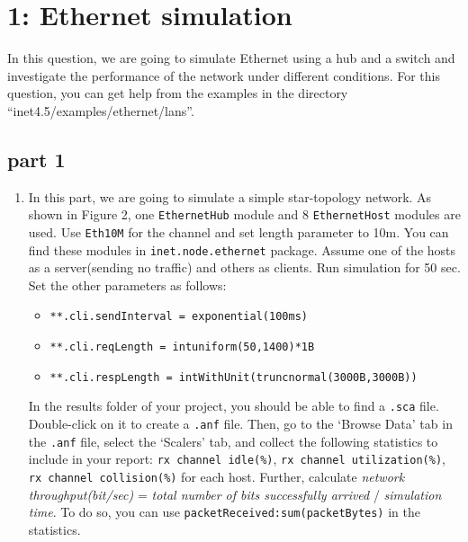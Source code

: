 \section{ 1: Ethernet simulation}
In this question, we are going to simulate Ethernet using a hub and a switch and investigate the performance of the network under different conditions. For this question, you can get help from the examples in the directory ``inet4.5/examples/ethernet/lans''.
\subsection{part 1}
\begin{enumerate}
    \item In this part, we are going to simulate a simple star-topology network. As shown in Figure 2, one \texttt{EthernetHub} module and 8 \texttt{EthernetHost} modules are used. Use \texttt{Eth10M} for the channel and set length parameter to 10m. You can find these modules in \texttt{inet.node.ethernet} package. Assume one of the hosts as a server(sending no traffic) and others as clients. Run simulation for 50 sec. Set the other parameters as follows:
    \begin{itemize}
        \item \texttt{**.cli.sendInterval = exponential(100ms)}
        \item \texttt{**.cli.reqLength = intuniform(50,1400)*1B}
        \item \texttt{**.cli.respLength = intWithUnit(truncnormal(3000B,3000B))}
    \end{itemize}
    
    In the results folder of your project, you should be able to find a \texttt{.sca} file. Double-click on it to create a \texttt{.anf} file. Then, go to the `Browse Data' tab in the \texttt{.anf} file, select the `Scalers' tab, and collect the following statistics to include in your report: \texttt{rx channel idle(\%)}, \texttt{rx channel utilization(\%)}, \texttt{rx channel collision(\%)} for each host. Further, calculate \textit{network throughput(bit/sec)} = \textit{total number of bits successfully arrived} / \textit{simulation time}. To do so, you can use \texttt{packetReceived:sum(packetBytes)} in the statistics.
\end{enumerate}
